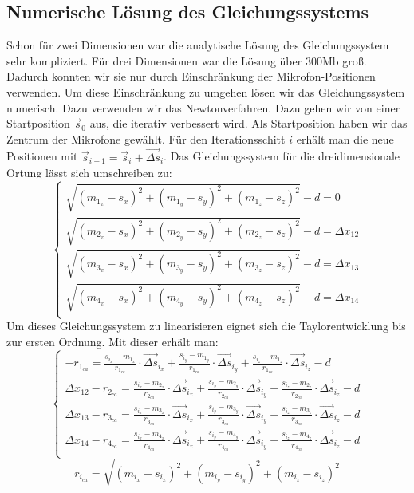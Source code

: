 \subsection{Numerische Lösung des Gleichungssystems}
Schon für zwei Dimensionen war die analytische Lösung des Gleichungssystem sehr kompliziert. Für drei Dimensionen war die Lösung über 300Mb groß. Dadurch konnten wir sie nur durch Einschränkung der Mikrofon-Positionen verwenden. Um diese Einschränkung zu umgehen lösen wir das Gleichungssystem numerisch. Dazu verwenden wir das Newtonverfahren. Dazu gehen wir von einer Startposition $\vec{s}_0$ aus, die iterativ verbessert wird. Als Startposition haben wir das Zentrum der Mikrofone gewählt. Für den Iterationsschitt $i$ erhält man die neue Positionen mit $\vec{s}_{i + 1} = \vec{s}_i + \vec{\Delta{s}}_i$. Das Gleichungssystem für die dreidimensionale Ortung lässt sich umschreiben zu:
$$\begin{cases}
\sqrt{(m_{1_x} - s_x)^2 + (m_{1_y} - s_y)^2 + (m_{1_z} - s_z)^2} - d = 0 \\
\sqrt{(m_{2_x} - s_x)^2 + (m_{2_y} - s_y)^2 + (m_{2_z} - s_z)^2} - d = \Delta{x_{12}} \\
\sqrt{(m_{3_x} - s_x)^2 + (m_{3_y} - s_y)^2 + (m_{3_z} - s_z)^2} - d = \Delta{x_{13}} \\
\sqrt{(m_{4_x} - s_x)^2 + (m_{4_y} - s_y)^2 + (m_{4_z} - s_z)^2} - d = \Delta{x_{14}} \\
\end{cases}$$
Um dieses Gleichungssystem zu linearisieren eignet sich die Taylorentwicklung bis zur ersten Ordnung. Mit dieser erhält man:
$$\begin{cases}
-r_{1_{ca}} = \frac{s_{i_x} - m_{1_x}}{r_{1_{ca}}} \cdot \vec{\Delta{s}}_{i_x} + \frac{s_{i_y} - m_{1_y}}{r_{1_{ca}}} \cdot \vec{\Delta{s}}_{i_y} + \frac{s_{i_z} - m_{1_z}}{r_{1_{ca}}} \cdot \vec{\Delta{s}}_{i_z} - d \\
\Delta{x_{12}} - r_{2_{ca}} = \frac{s_{i_x} - m_{2_x}}{r_{2_{ca}}} \cdot \vec{\Delta{s}}_{i_x} + \frac{s_{i_y} - m_{2_y}}{r_{2_{ca}}} \cdot \vec{\Delta{s}}_{i_y} + \frac{s_{i_z} - m_{2_z}}{r_{2_{ca}}} \cdot \vec{\Delta{s}}_{i_z} - d \\
\Delta{x_{13}} - r_{3_{ca}} = \frac{s_{i_x} - m_{3_x}}{r_{3_{ca}}} \cdot \vec{\Delta{s}}_{i_x} + \frac{s_{i_y} - m_{3_y}}{r_{3_{ca}}} \cdot \vec{\Delta{s}}_{i_y} + \frac{s_{i_z} - m_{3_z}}{r_{3_{ca}}} \cdot \vec{\Delta{s}}_{i_z} - d \\
\Delta{x_{14}} - r_{4_{ca}} = \frac{s_{i_x} - m_{4_x}}{r_{4_{ca}}} \cdot \vec{\Delta{s}}_{i_x} + \frac{s_{i_y} - m_{4_y}}{r_{4_{ca}}} \cdot \vec{\Delta{s}}_{i_y} + \frac{s_{i_z} - m_{4_z}}{r_{4_{ca}}} \cdot \vec{\Delta{s}}_{i_z} - d \\
\end{cases}$$
$$r_{i_{ca}} = \sqrt{(m_{i_x} - s_{i_x})^2 + (m_{i_y} - s_{i_y})^2 + (m_{i_z} - s_{i_z})^2}$$

